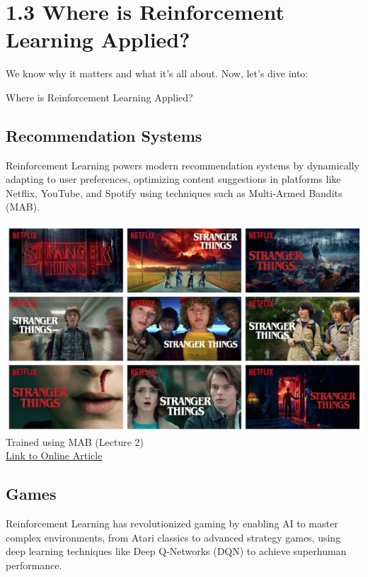 \documentclass[
  letterpaper,
  DIV=11,
  numbers=noendperiod]{scrreprt}
\begin{document}
\chapter{1.3 Where is Reinforcement Learning
Applied?}\label{where-is-reinforcement-learning-applied}

\begin{tcolorbox}[enhanced jigsaw, colback=white, left=2mm, breakable, opacityback=0, bottomrule=.15mm, rightrule=.15mm, arc=.35mm, colframe=quarto-callout-note-color-frame, leftrule=.75mm, toprule=.15mm]

We know why it matters and what it's all about. Now, let's dive into:

Where is Reinforcement Learning Applied? 🤔

\end{tcolorbox}

\section{Recommendation Systems}\label{recommendation-systems}

Reinforcement Learning powers modern recommendation systems by
dynamically adapting to user preferences, optimizing content suggestions
in platforms like Netflix, YouTube, and Spotify using techniques such as
Multi-Armed Bandits (MAB).

\includegraphics[width=0.5\linewidth,height=\textheight,keepaspectratio]{lecture1/images/Neflix.png}\\
Trained using MAB (Lecture 2)\\
\href{https://netflixtechblog.com/artwork-personalization-c589f074ad76}{Link
to Online Article}

\section{Games}\label{games}

Reinforcement Learning has revolutionized gaming by enabling AI to
master complex environments, from Atari classics to advanced strategy
games, using deep learning techniques like Deep Q-Networks (DQN) to
achieve superhuman performance.
\end{document}
